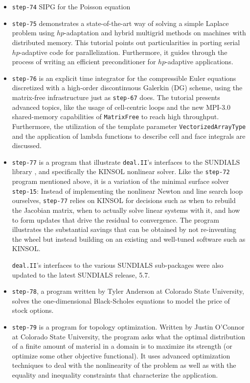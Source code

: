 \documentclass{ansarticle-preprint}
\newcommand{\specialword}[1]{\texttt{#1}}
\newcommand{\dealii}{{\specialword{deal.II}}\xspace}
\begin{document}
\begin{itemize}
\item \texttt{step-74} SIPG for the Poisson equation 
  
\item \texttt{step-75} demonstrates a state-of-the-art way of solving a simple
      Laplace problem using $hp$-adaptation and hybrid multigrid methods on machines
      with distributed memory. This tutorial points out particularities in porting
      serial $hp$-adaptive code for parallelization. Furthermore, it guides through
      the process of writing an efficient preconditioner for $hp$-adaptive applications.

\item \texttt{step-76} is an explicit time integrator for the
      compressible Euler equations discretized with a high-order discontinuous
      Galerkin (DG) scheme, using the matrix-free infrastructure just as \texttt{step-67} does.
      The tutorial presents advanced topics, like the usage of cell-centric loops and
      the new MPI-3.0 shared-memory capabilities of \texttt{MatrixFree} to reach high
      throughput. Furthermore, the utilization of the template parameter
      \texttt{VectorizedArrayType} and the application of lambda functions to describe cell and face
      integrals are discussed.

\item \texttt{step-77} is a program that illustrate \dealii{}'s
  interfaces to the SUNDIALS library \cite{sundials}, and specifically
  the KINSOL nonlinear solver. Like the \texttt{step-72} program
  mentioned above, it is a variation of the minimal surface solver
  \texttt{step-15}: Instead of implementing the nonlinear Newton and
  line search loop ourselves, \texttt{step-77} relies on KINSOL for
  decisions such as when to rebuild the Jacobian matrix, when to
  actually solve linear systems with it, and how to form updates that
  drive the residual to convergence. The program illustrates the
  substantial savings that can be obtained by not re-inventing the
  wheel but instead building on an existing and well-tuned software
  such as KINSOL.

  \dealii{}'s interfaces to the various SUNDIALS sub-packages were also updated to the latest SUNDIALS release, 5.7.

\item \texttt{step-78}, a program written by Tyler Anderson at
  Colorado State University, solves the
  one-dimensional Black-Scholes equations to model the price of stock
  options.

\item \texttt{step-79} is a program for topology optimization. Written
  by Justin O'Connor at Colorado State University, the program asks
  what the optimal distribution of a finite amount of material in a
  domain is to maximize its strength (or optimize some other objective
  functional). It uses advanced optimization techniques to deal with
  the nonlinearity of the problem as well as with the equality and
  inequality constraints that characterize the application.
\end{itemize}
\end{document}
